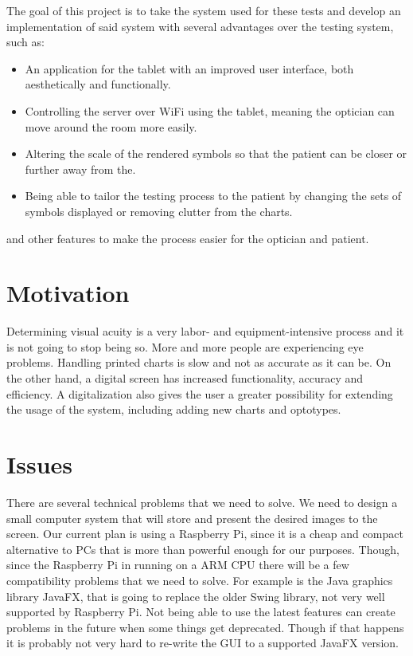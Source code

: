 \documentclass[12pt,a4paper,notitlepage]{report}
\begin{document}
The goal of this project is to take the system used for these tests and develop an implementation of said system with several advantages over the testing system, such as:

\begin{itemize}
	\item An application for the tablet with an improved user interface, both aesthetically and functionally.
	\item Controlling the server over WiFi using the tablet, meaning the optician can move around the room more easily.
	\item Altering the scale of the rendered symbols so that the patient can be closer or further away from the.
	\item Being able to tailor the testing process to the patient by changing the sets of symbols displayed or removing clutter from the charts.
\end{itemize}
	
and other features to make the process easier for the optician and patient.

\section{Motivation}
Determining visual acuity is a very labor- and equipment-intensive process and it is not going to stop being so. More and more people are experiencing eye problems. \cite{vision_loss} Handling printed charts is slow and not as accurate as it can be. On the other hand, a digital screen has increased functionality, accuracy and efficiency. A digitalization also gives the user a greater possibility for extending the usage of the system, including adding new charts and optotypes. 

\section{Issues}
There are several technical problems that we need to solve. We need to design a small computer system that will store and present the desired images to the screen. Our current plan is using a Raspberry Pi, since it is a cheap and compact alternative to PCs that is more than powerful enough for our purposes. Though, since the Raspberry Pi in running on a ARM CPU there will be a few compatibility problems that we need to solve. For example is the Java graphics library JavaFX, that is going to replace the older Swing library, not very well supported by Raspberry Pi. Not being able to use the latest features can create problems in the future when some things get deprecated. Though if that happens it is probably not very hard to re-write the GUI to a supported JavaFX version.
\end{document}
